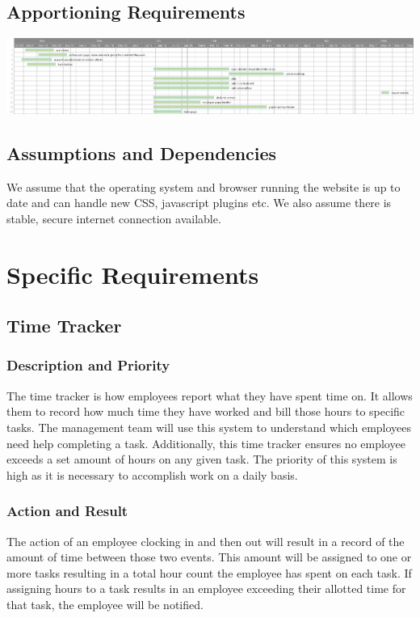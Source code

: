 \documentclass[letterpaper,10pt,titlepage,journal,compsoc,draftclsnofoot,onecolumn]{IEEEtran}
\begin{document}
\subsection{Apportioning Requirements}

\includegraphics[scale=0.25]{RequirementsDocument}

\subsection{Assumptions and Dependencies}

We assume that the operating system and browser running the website is up to date and can handle new CSS, javascript plugins etc. We also assume there is stable, secure internet connection available.

\section{Specific Requirements}

\subsection{Time Tracker}

\subsubsection{Description and Priority}

The time tracker is how employees report what they have spent time on. It allows them to record how much time they have worked and bill those hours to specific tasks. The management team will use this system to understand which employees need help completing a task. Additionally, this time tracker ensures no employee exceeds a set amount of hours on any given task. The priority of this system is high as it is necessary to accomplish work on a daily basis.

\subsubsection{Action and Result}

The action of an employee clocking in and then out will result in a record of the amount of time between those two events. This amount will be assigned to one or more tasks resulting in a total hour count the employee has spent on each task. If assigning hours to a task results in an employee exceeding their allotted time for that task, the employee will be notified.
\end{document}
